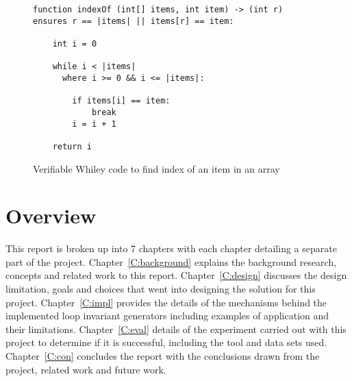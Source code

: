 \begin{figure}[ht]
\begin{lstlisting}
function indexOf (int[] items, int item) -> (int r)
ensures r == |items| || items[r] == item:

    int i = 0

    while i < |items|
      where i >= 0 && i <= |items|:

        if items[i] == item:
            break
        i = i + 1

    return i
\end{lstlisting}
\caption{Verifiable Whiley code to find index of an item in an array}
\label{lst:whiley-ex-1}
\end{figure}
%

\section{Overview}

This report is broken up into 7 chapters with each chapter detailing a separate part of the project.
Chapter~\ref{C:background} explains the background research, concepts and related work to this report.
Chapter~\ref{C:design} discusses the design limitation, goals and choices that went into designing the
solution for this project.
Chapter~\ref{C:impl} provides the details of the mechanisms behind the implemented 
loop invariant generators including examples of application and their limitations.
Chapter~\ref{C:eval} details of the experiment carried out with this project to determine if it is
successful, including the tool and data sets used.
Chapter~\ref{C:con} concludes the report with the conclusions drawn from the project,
related work and future work.  